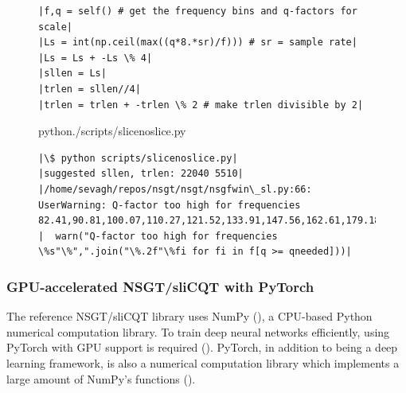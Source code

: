 \documentclass[report.tex]{subfiles}
\begin{document}
\begin{figure}[h]
  \centering
\begin{minipage}{\textwidth}
\begin{verbatim}
|f,q = self() # get the frequency bins and q-factors for scale|
|Ls = int(np.ceil(max((q*8.*sr)/f))) # sr = sample rate|
|Ls = Ls + -Ls \% 4|
|sllen = Ls|
|trlen = sllen//4|
|trlen = trlen + -trlen \% 2 # make trlen divisible by 2|
\end{verbatim}
\vspace{1em}
\end{minipage}
 \begin{minipage}{\textwidth}
  \centering
\setlength\partopsep{-\topsep}
\begin{inputminted}[linenos,breaklines,frame=single,fontsize=\scriptsize]{python}{./scripts/slicenoslice.py}
\end{inputminted}
 \vspace{1em}
 \end{minipage}
 \begin{minipage}{\textwidth}
  \centering
\begin{verbatim}
|\$ python scripts/slicenoslice.py|
|suggested sllen, trlen: 22040 5510|
|/home/sevagh/repos/nsgt/nsgt/nsgfwin\_sl.py:66: UserWarning: Q-factor too high for frequencies 82.41,90.81,100.07,110.27,121.52,133.91,147.56,162.61,179.18,...|
|  warn("Q-factor too high for frequencies \%s"\%",".join("\%.2f"\%fi for fi in f[q >= qneeded]))|
\end{verbatim}
 \end{minipage}
  \label{code:slicenoslice}
\end{figure}

\subsubsection{GPU-accelerated NSGT/sliCQT with PyTorch}
\label{sec:torchslicq}

The reference NSGT/sliCQT library uses NumPy (\cite{numpy}), a CPU-based Python numerical computation library. To train deep neural networks efficiently, using PyTorch with GPU support is required (\cite{pytorch}). PyTorch, in addition to being a deep learning framework, is also a numerical computation library which implements a large amount of NumPy's functions (\cite{pytorch}).
\end{document}

